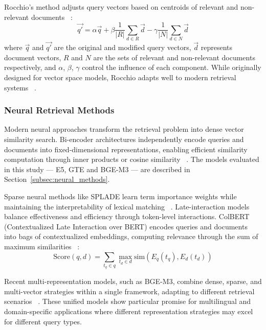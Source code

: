 \documentclass[preprint,12pt]{elsarticle}
\begin{document}
Rocchio's method adjusts query vectors based on centroids of relevant and non-relevant documents ~\cite{rocchio1971relevance}:
\begin{equation}
\vec{q'} = \alpha \vec{q} + \beta \frac{1}{|R|} \sum_{d \in R} \vec{d} - \gamma \frac{1}{|N|} \sum_{d \in N} \vec{d}
\end{equation}
where $\vec{q}$ and $\vec{q'}$ are the original and modified query vectors, $\vec{d}$ represents document vectors, $R$ and $N$ are the sets of relevant and non-relevant documents respectively, and $\alpha$, $\beta$, $\gamma$ control the influence of each component. While originally designed for vector space models, Rocchio adapts well to modern retrieval systems ~\cite{cao2008selecting}.

\subsubsection{Neural Retrieval Methods}

Modern neural approaches transform the retrieval problem into dense vector similarity search. Bi-encoder architectures independently encode queries and documents into fixed-dimensional representations, enabling efficient similarity computation through inner products or cosine similarity ~\cite{karpukhin2020dense}. The models evaluated in this study --- E5, GTE and BGE-M3 --- are described in Section~\ref{subsec:neural_methods}.

Sparse neural methods like SPLADE learn term importance weights while maintaining the interpretability of lexical matching ~\cite{formal2021splade}. Late-interaction models balance effectiveness and efficiency through token-level interactions. ColBERT (Contextualized Late Interaction over BERT) encodes queries and documents into bags of contextualized embeddings, computing relevance through the sum of maximum similarities ~\cite{khattab2020colbert}:
\begin{equation}
\text{Score}(q,d) = \sum_{t_q \in q} \max_{t_d \in d} \text{sim}(E_q(t_q), E_d(t_d))
\end{equation}

Recent multi-representation models, such as BGE-M3, combine dense, sparse, and multi-vector strategies within a single framework, adapting to different retrieval scenarios ~\cite{chen2024bge}. These unified models show particular promise for multilingual and domain-specific applications where different representation strategies may excel for different query types.
\end{document}
